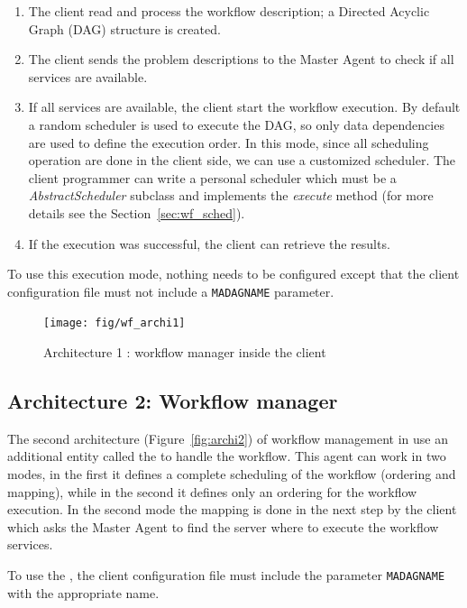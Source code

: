 \begin{enumerate}
\item The client read and process the workflow description; a Directed
  Acyclic Graph (DAG) structure is created.
\item The client sends the problem descriptions to the
  Master Agent to check if all services are available.
\item If all services are available, the client start the workflow
  execution. By default a random scheduler is used to execute the DAG,
  so only data dependencies are used to define the execution order.
  In this mode, since all scheduling operation are done in the client
  side, we can use a customized scheduler. The client programmer can
  write a personal scheduler which must be a
  \textit{AbstractScheduler} subclass and implements the
  \textit{execute} method (for more details see the
  Section~\ref{sec:wf_sched}).
\item If the execution was successful, the client can retrieve the
  results.
\end{enumerate}

To use this execution mode, nothing needs to be configured except that
the client configuration file must not include a \texttt{MADAGNAME} parameter.

\begin{figure}[htbp]
  \centering
  \texttt{[image: fig/wf\_archi1]}
  \caption{Architecture 1 : workflow manager inside the client}
  \label{fig:archi1}
\end{figure}



\subsection{Architecture 2: \madag Workflow manager}
\label{sec:archi2}

The second architecture (Figure~\ref{fig:archi2}) of workflow
management in \diet use an additional entity called the \madag to
handle the workflow. This agent can work in two modes, in the first it
defines a complete scheduling of the workflow (ordering and mapping),
while in the second it defines only an ordering for the workflow
execution. In the second mode the mapping is done in the next step by
the client which asks the Master Agent to find the server where
 to execute the workflow services.


To use the \madag, the client configuration file must include
the parameter \texttt{MADAGNAME} with the appropriate name.

